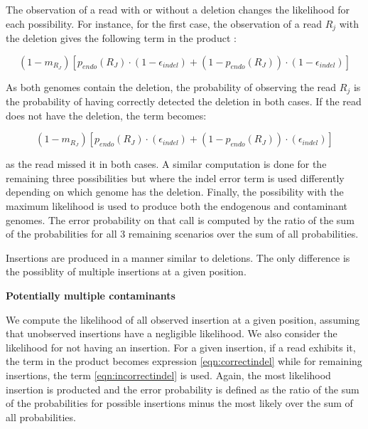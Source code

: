 \documentclass[a4paper,12pt]{article}
\begin{document}
{The observation of a read with or without a deletion changes the likelihood for each possibility. For instance, for the first case, the observation of a read $R_j$ with the deletion gives the following term in the product :

\begin{equation}
 (1-m_{R_J}) [  p_{endo}(R_J) \cdot (1-\epsilon_{indel})  +  (1-p_{endo}(R_J)) \cdot (1-\epsilon_{indel}) ] 
\label{eqn:bothcorrectdel}
\end{equation}

\noindent As both genomes contain the deletion, the probability of observing the read $R_j$ is the probability of having correctly detected the deletion in both cases. If the read does not have the deletion, the term becomes:

\begin{equation}
 (1-m_{R_J}) [  p_{endo}(R_J) \cdot (\epsilon_{indel})  +  (1-p_{endo}(R_J)) \cdot (\epsilon_{indel}) ] 
\label{eqn:bothincorrectdel}
\end{equation}

\noindent as the read missed it in both cases. A similar computation is done for the remaining three possibilities but where the indel error term is used differently depending on which genome has the deletion. Finally, the possibility with the maximum likelihood is used to produce both the endogenous and contaminant genomes. The error probability on that call is computed by the ratio of the sum of the probabilities for all 3 remaining scenarios over the sum of all probabilities. 



Insertions are produced in a manner similar to deletions. The only difference is the possiblity of multiple insertions at a given position. 

{\bf Potentially multiple contaminants}

We compute the likelihood of all observed insertion at a given position, assuming that unobserved insertions have a negligible likelihood. We also consider the likelihood for not having an insertion. For a given insertion, if a read exhibits it, the term in the product becomes expression \ref{eqn:correctindel} while for remaining insertions, the term \ref{eqn:incorrectindel} is used. Again, the most likelihood insertion is producted and the error probability is defined as the ratio of the sum of the probabilities for possible insertions minus the most likely over the sum of all probabilities.

}
\end{document}
